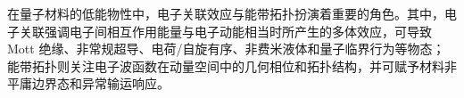 在量子材料的低能物性中，电子关联效应与能带拓扑扮演着重要的角色\cite{paschenQuantumPhasesDriven2021,keimerPhysicsQuantumMaterials2017,Hasan2010RevModPhys,Qi2011RevModPhys,bansilColloquiumTopologicalBand2016}。其中，电子关联强调电子间相互作用能量与电子动能相当时所产生的多体效应，可导致 Mott 绝缘、非常规超导、电荷/自旋有序、非费米液体和量子临界行为等物态；能带拓扑则关注电子波函数在动量空间中的几何相位和拓扑结构，并可赋予材料非平庸边界态和异常输运响应。
%
